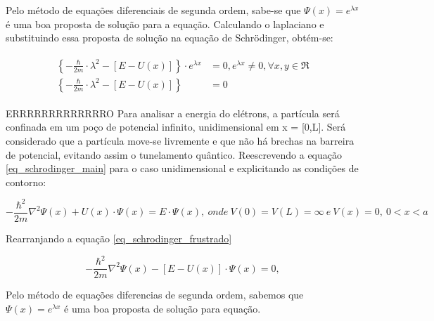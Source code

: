   \par Pelo método de equações diferenciais de segunda ordem, sabe-se que $\Psi(x)=e^{\lambda x}$ é uma boa proposta de solução para a equação. Calculando o laplaciano e substituindo essa proposta de solução na equação de Schrödinger, obtém-se:

  \begin{align}
    \label{schrodinger_6}
        \begin{array}{ll}
          \displaystyle \left\{ -\frac{\hbar}{2m}\cdot \lambda^2 - \left[ E - U(x) \right] \right\} \cdot e^{\lambda x} &= 0, e^{\lambda x} \neq 0, \forall x,y \in \Re\\
          \displaystyle \left\{ -\frac{\hbar}{2m}\cdot \lambda^2 - \left[ E - U(x) \right] \right\} &= 0
        \end{array}
  \end{align}

    \par ERRRRRRRRRRRRRO Para analisar a energia do elétrons, a partícula será confinada em um poço de potencial infinito, unidimensional em x = [0,L]. Será considerado que a partícula move-se livremente e que não há brechas na barreira de potencial, evitando assim o tunelamento quântico. Reescrevendo a equação \eqref{eq_schrodinger_main} para o caso unidimensional e explicitando as condições de contorno:

    \begin{equation}\label{eq_schrodinger_frustrado}
      -\frac{\hbar^2}{2m} \nabla^2 \Psi(x) + U(x) \cdot \Psi(x) = E \cdot \Psi(x),
      \ onde\ V(0)=V(L)=\infty\ e\ V(x)=0,\ 0<x<a
    \end{equation}

    \par Rearranjando a equação \eqref{eq_schrodinger_frustrado}

    \begin{equation}\label{eq_schrodinger_frustrado}
      -\frac{\hbar^2}{2m} \nabla^2 \Psi(x) - [E - U(x)] \cdot \Psi(x) = 0,
    \end{equation}

    \par Pelo método de equações diferencias de segunda ordem, sabemos que $\Psi(x) = e^{\lambda x}$ é uma boa proposta de solução para equação.

    \begin{equation}
      \label{eq_schrodinger_frustrado_1}
    \end{equation}

